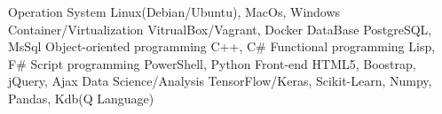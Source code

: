 \begin{cvhonors}
  	\cvhonor
    	{Operation System}
	{Linux(Debian/Ubuntu), MacOs, Windows}
    	{}
    	{}
	\cvhonor
	{Container/Virtualization}
	{VitrualBox/Vagrant, Docker}
	{}
	{}
	\cvhonor
    	{DataBase}
    	{PostgreSQL, MsSql}
    	{}
	{}
  	\cvhonor
    	{Object-oriented programming}
	{C++, C\#}
    	{}
    	{}
    \cvhonor
        {Functional programming}
    {Lisp, F\#}
        {}
        {}
    \cvhonor
        {Script programming}
    {PowerShell, Python}
        {}
        {}
	\cvhonor
	{Front-end}
	{HTML5, Boostrap, jQuery, Ajax}
	{}
	{}
  	\cvhonor
    	{Data Science/Analysis}
	{TensorFlow/Keras, Scikit-Learn, Numpy, Pandas, Kdb(Q Language)}
    	{}
    	{}
\end{cvhonors}
